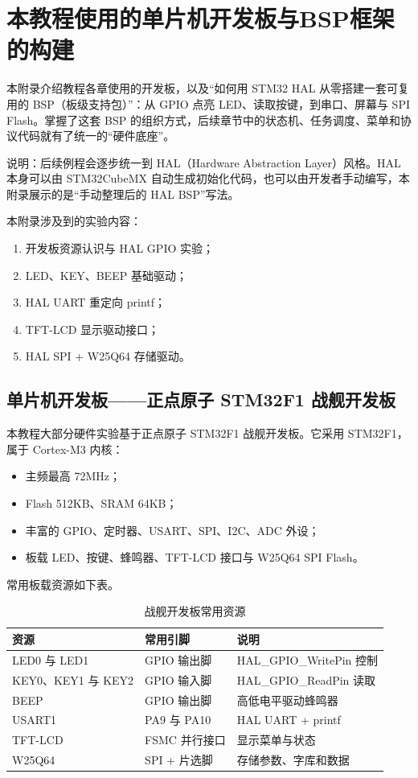 \chapter{本教程使用的单片机开发板与BSP框架的构建}

本附录介绍教程各章使用的开发板，以及“如何用 STM32 HAL 从零搭建一套可复用的 BSP（板级支持包）”：从 GPIO 点亮 LED、读取按键，到串口、屏幕与 SPI Flash。掌握了这套 BSP 的组织方式，后续章节中的状态机、任务调度、菜单和协议代码就有了统一的“硬件底座”。

说明：后续例程会逐步统一到 HAL（Hardware Abstraction Layer）风格。HAL 本身可以由 STM32CubeMX 自动生成初始化代码，也可以由开发者手动编写，本附录展示的是“手动整理后的 HAL BSP”写法。

\medskip 本附录涉及到的实验内容：
\begin{enumerate}
\item 开发板资源认识与 HAL GPIO 实验；
\item LED、KEY、BEEP 基础驱动；
\item HAL UART 重定向 printf；
\item TFT-LCD 显示驱动接口；
\item HAL SPI + W25Q64 存储驱动。
\end{enumerate}

\section{单片机开发板——正点原子 STM32F1 战舰开发板}

本教程大部分硬件实验基于正点原子 STM32F1 战舰开发板。它采用 STM32F1，属于 Cortex-M3 内核：

\begin{itemize}
\item 主频最高 72MHz；
\item Flash 512KB、SRAM 64KB；
\item 丰富的 GPIO、定时器、USART、SPI、I2C、ADC 外设；
\item 板载 LED、按键、蜂鸣器、TFT-LCD 接口与 W25Q64 SPI Flash。
\end{itemize}

常用板载资源如下表。

\begin{table}[htbp]
\centering \caption{战舰开发板常用资源} \label{tab:board-resource}
    \begin{tabular}{lll}
        \toprule
        资源 & 常用引脚 & 说明 \\
        \midrule
        LED0 与 LED1 & GPIO 输出脚 & HAL\_GPIO\_WritePin 控制 \\
        KEY0、KEY1 与 KEY2 & GPIO 输入脚 & HAL\_GPIO\_ReadPin 读取 \\
        BEEP & GPIO 输出脚 & 高低电平驱动蜂鸣器 \\
        USART1 & PA9 与 PA10 & HAL UART + printf \\
        TFT-LCD & FSMC 并行接口 & 显示菜单与状态 \\
        W25Q64 & SPI + 片选脚 & 存储参数、字库和数据 \\
        \bottomrule
    \end{tabular}
\end{table}

